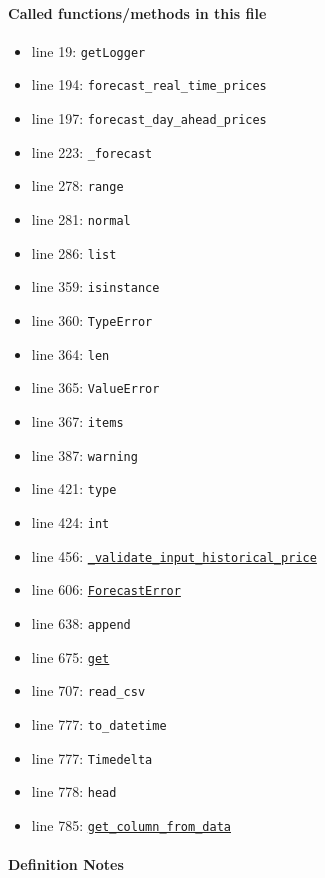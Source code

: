 \documentclass[11pt]{report}
\begin{document}
\paragraph{Called functions/methods in this file}
\begin{itemize}[leftmargin=*]
  \item line 19: \texttt{getLogger}
  \item line 194: \texttt{forecast\_real\_time\_prices}
  \item line 197: \texttt{forecast\_day\_ahead\_prices}
  \item line 223: \texttt{\_forecast}
  \item line 278: \texttt{range}
  \item line 281: \texttt{normal}
  \item line 286: \texttt{list}
  \item line 359: \texttt{isinstance}
  \item line 360: \texttt{TypeError}
  \item line 364: \texttt{len}
  \item line 365: \texttt{ValueError}
  \item line 367: \texttt{items}
  \item line 387: \texttt{warning}
  \item line 421: \texttt{type}
  \item line 424: \texttt{int}
  \item line 456: \hyperref[def:forecaster.py:Backcaster._validate_input_historical_price:L348]{\texttt{\_validate\_input\_historical\_price}}
  \item line 606: \hyperref[def:forecaster.py:ForecastError:L22]{\texttt{ForecastError}}
  \item line 638: \texttt{append}
  \item line 675: \hyperref[def:tests-test_backcaster.py:DAPrices.get:L294]{\texttt{get}}
  \item line 707: \texttt{read\_csv}
  \item line 777: \texttt{to\_datetime}
  \item line 777: \texttt{Timedelta}
  \item line 778: \texttt{head}
  \item line 785: \hyperref[def:forecaster.py:PerfectForecaster.get_column_from_data:L762]{\texttt{get\_column\_from\_data}}
\end{itemize}
\paragraph{Definition Notes}
\end{document}
